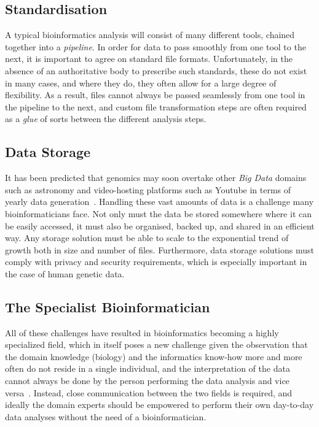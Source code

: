 \begin{justify}
\subsection{Standardisation}
A typical bioinformatics analysis will consist of many different tools, chained together into a \emph{pipeline}. In order for data to pass smoothly from one tool to the next, it is important to agree on standard file formats. Unfortunately, in the absence of an authoritative body to prescribe such standards, these do not exist in many cases, and where they do, they often allow for a large degree of flexibility. As a result, files cannot always be passed seamlessly from one tool in the pipeline to the next, and custom file transformation steps are often required as a \emph{glue} of sorts between the different analysis steps.


\subsection{Data Storage}

It has been predicted that genomics may soon overtake other \emph{Big Data} domains such as astronomy and video-hosting platforms such as Youtube in terms of yearly data generation~\cite{Stephens2015}. Handling these vast amounts of data is a challenge many bioinformaticians face. Not only must the data be stored somewhere where it can be easily accessed, it must also be organised, backed up, and shared in an efficient way. Any storage solution must be able to scale to the exponential trend of growth both in size and number of files. Furthermore, data storage solutions must comply with privacy and security requirements, which is especially important in the case of human genetic data.


\subsection{The Specialist Bioinformatician}
All of these challenges have resulted in bioinformatics becoming a highly specialized field, which in itself poses a new challenge given the observation that the domain knowledge (biology) and the informatics know-how more and more often do not reside in a single individual, and the interpretation of the data cannot always be done by the person performing the data analysis and vice versa~\cite{preeyanon2014reproducible}. Instead, close communication between the two fields is required, and ideally the domain experts should be empowered to perform their own day-to-day data analyses without the need of a bioinformatician.



\end{justify}
